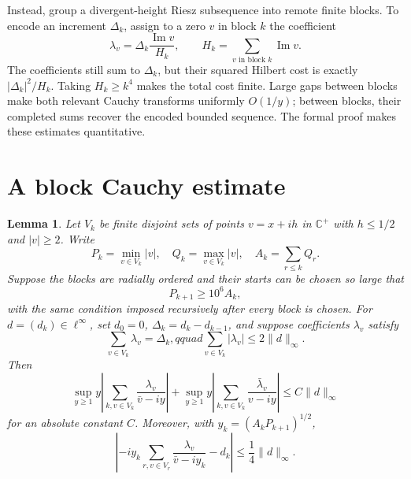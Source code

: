 \documentclass[11pt]{article}
\newtheorem{lemma}[theorem]{Lemma}
\newcommand{\C}{\mathbb C}
\newcommand{\linf}{\ell^\infty}
\begin{document}
Instead, group a divergent-height Riesz subsequence into remote finite
blocks.  To encode an increment $\Delta_k$, assign to a zero $v$ in block
$k$ the coefficient
\[
 \lambda_v=\Delta_k\frac{\operatorname{Im}v}{H_k},
 \qquad H_k=\sum_{v\text{ in block }k}\operatorname{Im}v.
\]
The coefficients still sum to $\Delta_k$, but their squared Hilbert cost is
exactly $|\Delta_k|^2/H_k$.  Taking $H_k\ge k^4$ makes the total cost finite.
Large gaps between blocks make both relevant Cauchy transforms uniformly
$O(1/y)$; between blocks, their completed sums recover the encoded bounded
sequence.  The formal proof makes these estimates quantitative.

\section{A block Cauchy estimate}

\begin{lemma}\label{lem:block}
Let $V_k$ be finite disjoint sets of points $v=x+ih$ in $\C^+$ with
$h\le1/2$ and $|v|\ge2$.  Write
\[
 P_k=\min_{v\in V_k}|v|,\quad Q_k=\max_{v\in V_k}|v|,
 \quad A_k=\sum_{r\le k}Q_r.
\]
Suppose the blocks are radially ordered and their starts can be chosen so
large that
\[
 P_{k+1}\ge10^6 A_k,                                      \tag{2}
\]
with the same condition imposed recursively after every block is chosen.
For $d=(d_k)\in\linf$, set $d_0=0$, $\Delta_k=d_k-d_{k-1}$, and suppose
coefficients $\lambda_v$ satisfy
\[
 \sum_{v\in V_k}\lambda_v=\Delta_k,qquad
 \sum_{v\in V_k}|\lambda_v|\le2\|d\|_\infty.             \tag{3}
\]
Then
\[
 \sup_{y\ge1}y\left|\sum_{k,v\in V_k}
       \frac{\lambda_v}{\bar v-iy}\right|
 +\sup_{y\ge1}y\left|\sum_{k,v\in V_k}
       \frac{\bar\lambda_v}{v-iy}\right|
 \le C\|d\|_\infty                                      \tag{4}
\]
for an absolute constant $C$.  Moreover, with
$y_k=(A_kP_{k+1})^{1/2}$,
\[
 \left|-iy_k\sum_{r,v\in V_r}
       \frac{\lambda_v}{\bar v-iy_k}-d_k\right|
 \le\frac14\|d\|_\infty.                                \tag{5}
\]
\end{lemma}
\end{document}
